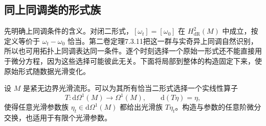 \subsection{同上同调类的形式族}
\label{g4:subsec:0801:02}

先明确上同调条件的含义。对闭二形式，\([\omega_t]=[\omega_0]\) 在 \(H^2_{\mathrm{dR}}(M)\) 中成立，按定义等价于 \(\omega_t-\omega_0\) 恰当。第二卷定理7.3.11把这一群与实奇异上同调自然识别，所以也可用拓扑上同调表达同一条件。逐个时刻选择一个原始一形式还不能直接用于微分方程，因为这些选择可能彼此无关。下面将局部到整体的构造固定下来，使原始形式随数据光滑变化。

\begin{lemma}\label{g4:lem:0801:smooth-primitives}
	设 \(M\) 是紧无边界光滑流形。可以为其所有恰当二形式选择一个实线性算子
	\[
		T:\mathrm{d}\Omega^1(M)\longrightarrow\Omega^1(M),
		\qquad \mathrm{d}(T\eta)=\eta,
	\]
	使得任意光滑参数族 \(\eta_t\in\mathrm{d}\Omega^1(M)\) 都给出光滑族 \(T\eta_t\)。构造与参数的任意阶微分交换，也适用于有限个光滑参数。
\end{lemma}
